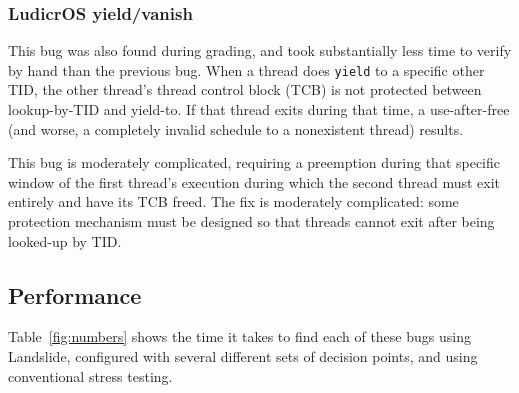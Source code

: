 \subsubsection{LudicrOS yield/vanish}

This bug was also found during grading, and took substantially less time to verify by hand than the previous bug. When a thread does \texttt{yield} to a specific other TID, the other thread's thread control block (TCB) is not protected between lookup-by-TID and yield-to. If that thread exits during that time, a use-after-free (and worse, a completely invalid schedule to a nonexistent thread) results.

This bug is moderately complicated, requiring a preemption during that specific window of the first thread's execution during which the second thread must exit entirely and have its TCB freed. The fix is moderately complicated: some protection mechanism must be designed so that threads cannot exit after being looked-up by TID.

\subsection{Performance}
\label{sec:eval-numbers}

Table~\ref{fig:numbers} shows the time it takes to find each of these bugs using Landslide, configured with several different sets of decision points, and using conventional stress testing.

\newcommand\bugnum[2]{\textcolor{BrickRed}{{\bf #1} {\scriptsize \em (#2)}}}
\newcommand\nobugnum[2]{\textcolor{Blue}{[{\em #1 {\scriptsize (#2)}}]}}

